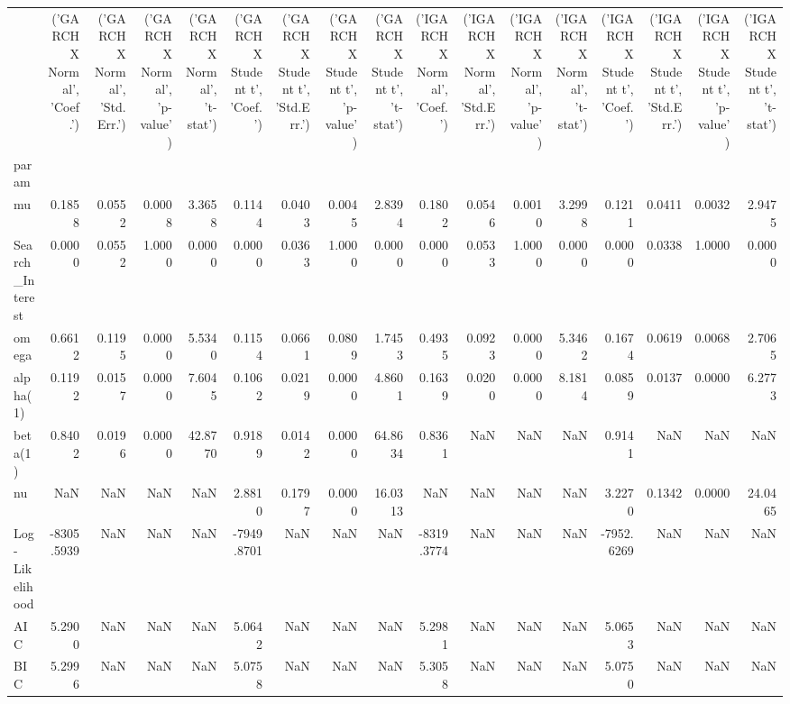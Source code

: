 \begin{table}[htbp]
\centering
\begin{tabular}{lrrrrrrrrrrrrrrrr}
\toprule
 & ('GARCHX Normal', 'Coef.') & ('GARCHX Normal', 'Std.Err.') & ('GARCHX Normal', 'p-value') & ('GARCHX Normal', 't-stat') & ('GARCHX Student t', 'Coef.') & ('GARCHX Student t', 'Std.Err.') & ('GARCHX Student t', 'p-value') & ('GARCHX Student t', 't-stat') & ('IGARCHX Normal', 'Coef.') & ('IGARCHX Normal', 'Std.Err.') & ('IGARCHX Normal', 'p-value') & ('IGARCHX Normal', 't-stat') & ('IGARCHX Student t', 'Coef.') & ('IGARCHX Student t', 'Std.Err.') & ('IGARCHX Student t', 'p-value') & ('IGARCHX Student t', 't-stat') \\
param &  &  &  &  &  &  &  &  &  &  &  &  &  &  &  &  \\
\midrule
mu & 0.1858 & 0.0552 & 0.0008 & 3.3658 & 0.1144 & 0.0403 & 0.0045 & 2.8394 & 0.1802 & 0.0546 & 0.0010 & 3.2998 & 0.1211 & 0.0411 & 0.0032 & 2.9475 \\
Search_Interest & 0.0000 & 0.0552 & 1.0000 & 0.0000 & 0.0000 & 0.0363 & 1.0000 & 0.0000 & 0.0000 & 0.0533 & 1.0000 & 0.0000 & 0.0000 & 0.0338 & 1.0000 & 0.0000 \\
omega & 0.6612 & 0.1195 & 0.0000 & 5.5340 & 0.1154 & 0.0661 & 0.0809 & 1.7453 & 0.4935 & 0.0923 & 0.0000 & 5.3462 & 0.1674 & 0.0619 & 0.0068 & 2.7065 \\
alpha(1) & 0.1192 & 0.0157 & 0.0000 & 7.6045 & 0.1062 & 0.0219 & 0.0000 & 4.8601 & 0.1639 & 0.0200 & 0.0000 & 8.1814 & 0.0859 & 0.0137 & 0.0000 & 6.2773 \\
beta(1) & 0.8402 & 0.0196 & 0.0000 & 42.8770 & 0.9189 & 0.0142 & 0.0000 & 64.8634 & 0.8361 & NaN & NaN & NaN & 0.9141 & NaN & NaN & NaN \\
nu & NaN & NaN & NaN & NaN & 2.8810 & 0.1797 & 0.0000 & 16.0313 & NaN & NaN & NaN & NaN & 3.2270 & 0.1342 & 0.0000 & 24.0465 \\
Log-Likelihood & -8305.5939 & NaN & NaN & NaN & -7949.8701 & NaN & NaN & NaN & -8319.3774 & NaN & NaN & NaN & -7952.6269 & NaN & NaN & NaN \\
AIC & 5.2900 & NaN & NaN & NaN & 5.0642 & NaN & NaN & NaN & 5.2981 & NaN & NaN & NaN & 5.0653 & NaN & NaN & NaN \\
BIC & 5.2996 & NaN & NaN & NaN & 5.0758 & NaN & NaN & NaN & 5.3058 & NaN & NaN & NaN & 5.0750 & NaN & NaN & NaN \\
\bottomrule
\end{tabular}
\label{tab:garchx_igarchx_params}
\end{table}
